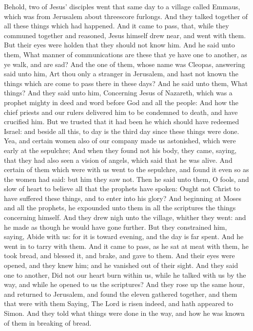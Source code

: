 Behold, two of Jesus' disciples went that same day to a village called Emmaus, which was from Jerusalem about threescore furlongs. And they talked together of all these things which had happened. And it came to pass, that, while they communed together and reasoned, Jesus himself drew near, and went with them. But their eyes were holden that they should not know him. And he said unto them, What manner of communications are these that ye have one to another, as ye walk, and are sad? And the one of them, whose name was Cleopas, answering said unto him, Art thou only a stranger in Jerusalem, and hast not known the things which are come to pass there in these days? And he said unto them, What things? And they said unto him, Concerning Jesus of Nazareth, which was a prophet mighty in deed and word before God and all the people: And how the chief priests and our rulers delivered him to be condemned to death, and have crucified him. But we trusted that it had been he which should have redeemed Israel: and beside all this, to day is the third day since these things were done. Yea, and certain women also of our company made us astonished, which were early at the sepulchre; And when they found not his body, they came, saying, that they had also seen a vision of angels, which said that he was alive. And certain of them which were with us went to the sepulchre, and found it even so as the women had said: but him they saw not. Then he said unto them, O fools, and slow of heart to believe all that the prophets have spoken: Ought not Christ to have suffered these things, and to enter into his glory? And beginning at Moses and all the prophets, he expounded unto them in all the scriptures the things concerning himself. And they drew nigh unto the village, whither they went: and he made as though he would have gone further. But they constrained him, saying, Abide with us: for it is toward evening, and the day is far spent. And he went in to tarry with them. And it came to pass, as he sat at meat with them, he took bread, and blessed it, and brake, and gave to them. And their eyes were opened, and they knew him; and he vanished out of their sight. And they said one to another, Did not our heart burn within us, while he talked with us by the way, and while he opened to us the scriptures? And they rose up the same hour, and returned to Jerusalem, and found the eleven gathered together, and them that were with them Saying, The Lord is risen indeed, and hath appeared to Simon. And they told what things were done in the way, and how he was known of them in breaking of bread.

